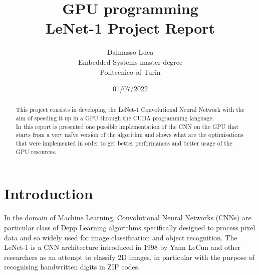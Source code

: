 \documentclass[a4paper]{report}
\begin{document}
\title{GPU programming \\ LeNet-1 Project Report}
\author{Dalmasso Luca\\
        Embedded Systems master degree\\
        Politecnico of Turin
        }

\date{01/07/2022}

\maketitle
\tableofcontents
\listoffigures
\listoftables


\begin{abstract}
This project consists in developing the LeNet-1 Convolutional Neural Network with the aim of speeding it up in a GPU through the CUDA programming language.\\
In this report is presented one possible implementation of the CNN on the GPU that starts from a very naïve version of the algorithm and shows what are the optimisations that were implemented in order to get better performances and better usage of the GPU resources.

\end{abstract}

\section{Introduction}
In the domain of Machine Learning, Convolutional Neural Networks (CNNs) are particular class of  Depp Learning algorithms specifically designed to process pixel data and so  widely used for image classification and object recognition.
The LeNet-1 is a CNN architecture introduced in 1998 by Yann LeCun and other researchers as an attempt to classify 2D images, in particular with the purpose of recognising handwritten digits in ZIP codes.

\end{document}
